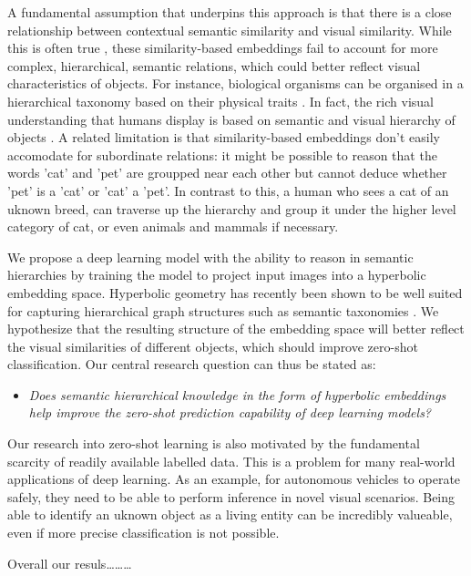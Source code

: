 \documentclass[12pt]{report}
\begin{document}
A fundamental assumption that underpins this approach is that there is a close relationship between contextual semantic similarity and visual similarity. While this is often true \cite{Deselaers2011}, these similarity-based embeddings fail to account for more complex, hierarchical, semantic relations, which could better reflect visual characteristics of objects. For instance, biological organisms can be organised in a hierarchical taxonomy based on their physical traits \cite{Ohl2015}. In fact, the rich visual understanding that humans display is based on semantic and visual hierarchy of objects \cite{Joliceur1984}. A related limitation is that similarity-based embeddings don't easily accomodate for subordinate relations: it might be possible to reason that the words 'cat' and 'pet' are groupped near each other but cannot deduce whether 'pet' is a 'cat' or 'cat' a 'pet'. In contrast to this, a human who sees a cat of an uknown breed, can traverse up the hierarchy and group it under the higher level category of cat, or even animals and mammals if necessary. 

We propose a deep learning model with the ability to reason in semantic hierarchies by training the model to project input images into a hyperbolic embedding space. Hyperbolic geometry has recently been shown to be well suited for capturing hierarchical graph structures such as semantic taxonomies \cite{Nickel2017, Chamberlain2017}. We hypothesize that the resulting structure of the embedding space will better reflect the visual similarities of different objects, which should improve zero-shot classification. Our central research question can thus be stated as: 
\begin{itemize}
  \item \textit{Does semantic hierarchical knowledge in the form of hyperbolic embeddings help improve the zero-shot prediction capability of deep learning models?}
\end{itemize}

Our research into zero-shot learning is also motivated by the fundamental scarcity of readily available labelled data. This is a problem for many real-world applications of deep learning. As an example, for autonomous vehicles to operate safely, they need to be able to perform inference in novel visual scenarios. Being able to identify an uknown object as a living entity can be incredibly valueable, even if more precise classification is not possible.

Overall our resuls\dots\dots\dots
\end{document}
